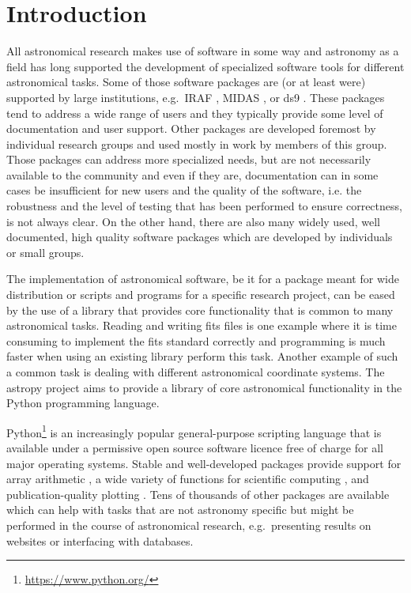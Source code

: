 \documentclass[modern]{aastex61}
\begin{document}
\section{Introduction} \label{sec:intro}
All astronomical research makes use of software in some way and
astronomy as a field has long supported the development of specialized
software tools for different astronomical tasks. Some of those
software packages are (or at least were) supported by large
institutions, e.g.\ IRAF \citep[developed at NOAO,][]{IRAF}, MIDAS
\citep[developed at ESO,][]{MIDAS}, or ds9 \citep[developed at
%
%
  SAO,][]{ds9}. These packages tend to address a wide range of users
and they typically provide some level of documentation and user
support. Other packages are developed foremost by individual research
groups and used mostly in work by members of this group. Those
packages can address more specialized needs, but are not necessarily
available to the community and even if they are, documentation can in
some cases be insufficient for new users and the quality of the
software, i.e. the robustness and the level of testing that has been
performed to ensure correctness, is not always clear. On the other
hand, there are also many widely used, well documented, high quality
software packages which are developed by individuals or small groups.

The implementation of astronomical software, be it for a package meant
for wide distribution or scripts and programs for a specific research
project, can be eased by the use of a library that provides core
functionality that is common to many astronomical tasks. Reading and
writing fits files is one example where it is time
consuming to implement the fits standard correctly and
programming is much faster when using an existing library perform this
task. Another example of such a common task is dealing with different
astronomical coordinate systems. The astropy project aims to provide a
library of core astronomical functionality in the Python programming
language.

Python\footnote{\url{https://www.python.org/}} is an increasingly
popular general-purpose scripting language that is available under a
permissive open source software licence free of charge for all major
operating systems. Stable and well-developed packages provide support
for array arithmetic \citep[numpy,][]{numpy}, a wide variety of
functions for scientific computing \citep[scipy,][]{numpy}, and
publication-quality plotting \citep[matplotlib,][]{matplotlib}. Tens of
thousands of other packages are available which can help with tasks
that are not astronomy specific but might be performed in the course
of astronomical research, e.g.\ presenting results on websites or
interfacing with databases.
\end{document}
